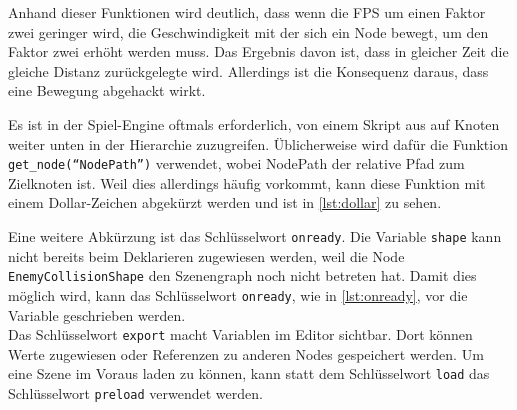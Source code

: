 Anhand dieser Funktionen wird deutlich, dass wenn die \ac{FPS} um einen Faktor zwei geringer wird, die Geschwindigkeit mit der sich ein Node bewegt, um den Faktor zwei erhöht werden muss. Das Ergebnis davon ist, dass in gleicher Zeit die gleiche Distanz zurückgelegte wird. Allerdings ist die Konsequenz daraus, dass eine Bewegung abgehackt wirkt.


Es ist in der Spiel-Engine oftmals erforderlich, von einem Skript aus auf Knoten weiter unten in der Hierarchie zuzugreifen. Üblicherweise wird dafür die Funktion \texttt{get\_node(``NodePath'')} verwendet, wobei NodePath der relative Pfad zum Zielknoten ist. Weil dies allerdings häufig vorkommt, kann diese Funktion mit einem Dollar-Zeichen abgekürzt werden und ist in \autoref{lst:dollar} zu sehen.


Eine weitere Abkürzung ist das Schlüsselwort \texttt{onready}. Die Variable \texttt{shape} kann nicht bereits beim Deklarieren zugewiesen werden, weil die Node \texttt{EnemyCollisionShape} den Szenengraph noch nicht betreten hat. Damit dies möglich wird, kann das Schlüsselwort \texttt{onready}, wie in \autoref{lst:onready}, vor die Variable geschrieben werden.\\

Das Schlüsselwort \texttt{export} macht Variablen im Editor sichtbar. Dort können Werte zugewiesen oder Referenzen zu anderen Nodes gespeichert werden. Um eine Szene im Voraus laden zu können, kann statt dem Schlüsselwort \texttt{load} das Schlüsselwort \texttt{preload} verwendet werden.

